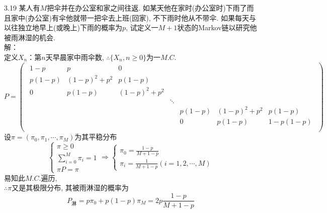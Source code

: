 3.19 某人有$M$把伞并在办公室和家之间往返. 如某天他在家时(办公室时)下雨了而且家中(办公室)有伞他就带一把伞去上班(回家), 不下雨时他从不带伞. 如果每天与以往独立地早上(或晚上)下雨的概率为$p$, 试定义一$M+1$状态的Markov链以研究他被雨淋湿的机会.\\
解：\\
定义$X_n$：第$n$天早晨家中雨伞数, $\therefore \{X_n, n \geqslant 0\}$为一$M.C.$\\
	\[
	P =
	\begin{pmatrix}
	\begin{smallmatrix}
		1-p & p & 0 & ~ & ~ & ~ & ~\\
		p(1-p) & (1-p)^2+p^2 & p(1-p) & ~ & ~ & ~ & ~\\
		0 & p(1-p) & (1-p)^2+p^2 & ~ & ~ & ~ & ~\\
		~ & ~ & ~ & \ddots & ~ & ~ & ~\\
		~ & ~ & ~ & ~ & p(1-p) & (1-p)^2+p^2 & p(1-p)\\
		~ & ~ & ~ & ~ & 0 & p(1-p) & 1-p(1-p)\\
	\end{smallmatrix}
	\end{pmatrix}
	\]
	设$\pi = (\pi_0, \pi_1, \cdots, \pi_M)$为其平稳分布\\
	\[
	\begin{cases}
	\pi \geqslant 0\\
	\sum\limits^M_{i=0}\pi_i = 1\\
	\pi P = \pi
	\end{cases}
	\Rightarrow
	\begin{cases}
	\pi_0 = \frac{1-p}{M+1-p}\\
	\pi_i = \frac{1}{M+1-p} (i = 1,2,\cdots,M)
	\end{cases}
	\]
易知此$M.C.$遍历, \\
$\therefore \pi$又是其极限分布, 其被雨淋湿的概率为
\[
P_{\text{淋}} = p\pi_0+p(1-p)\pi_M = 2p\frac{1-p}{M+1-p}
\]


